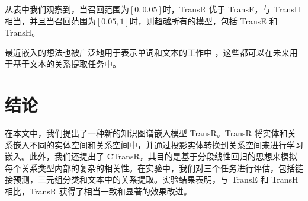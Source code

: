     从表中我们观察到，当召回范围为$[0,0.05]$时，TransR 优于 TransE，与 TransH 相当，并且当召回范围为$[0.05,1]$时，则超越所有的模型，包括 TransE 和 TransH。

    最近嵌入的想法也被广泛地用于表示单词和文本的工作中 ，这些都可以在未来用于基于文本的关系提取任务中。

    \section{结论}
    在本文中，我们提出了一种新的知识图谱嵌入模型 TransR。TransR 将实体和关系嵌入不同的实体空间和关系空间中，并通过投影实体转换到关系空间来进行学习嵌入。此外，我们还提出了 CTransR，其目的是基于分段线性回归的思想来模拟每个关系类型内部的复杂的相关性。在实验中，我们对三个任务进行评估，包括链接预测，三元组分类和文本中的关系提取。实验结果表明，与 TransE 和 TransH 相比，TransR 获得了相当一致和显著的效果改进。















